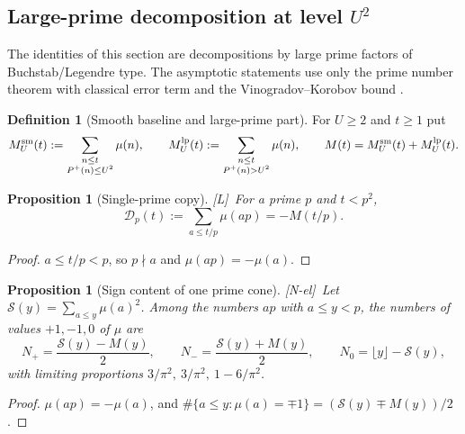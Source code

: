 \documentclass[11pt]{amsart}
\numberwithin{equation}{section}
\theoremstyle{plain}
\newtheorem{proposition}[theorem]{Proposition}
\theoremstyle{definition}
\newtheorem{definition}[theorem]{Definition}
\theoremstyle{remark}
\newcommand{\Pp}{P^{+}}
\newcommand{\Sq}{\mathcal{S}}
\newcommand{\tagNE}{\textup{[N-el]}}
\newcommand{\tagL}{\textup{[L]}}
\begin{document}
\subsection{Large-prime decomposition at level \texorpdfstring{$U^2$}{U squared}}
\label{sec:prime_copy_propagation}

The identities of this section are decompositions by large prime factors of
Buchstab/Legendre type. The asymptotic statements use only the prime number
theorem with classical error term and the Vinogradov--Korobov bound
\cite{MontgomeryVaughan2007,Walfisz1963}.

\begin{definition}[Smooth baseline and large-prime part]
\label{def:baseline_channel}
For $U\ge2$ and $t\ge1$ put
\begin{equation}
\label{eq:baseline_channel_def}
  M^{\rm sm}_U(t):=\sum_{\substack{n\le t\\ \Pp(n)\le U^2}}\mu(n),\qquad
  M^{\rm lp}_U(t):=\sum_{\substack{n\le t\\ \Pp(n)>U^2}}\mu(n),\qquad
  M(t)=M^{\rm sm}_U(t)+M^{\rm lp}_U(t).
\end{equation}
\end{definition}

\begin{proposition}[Single-prime copy]
\label{prop:single_prime_copy}
\tagL\ For a prime $p$ and $t<p^2$,
\begin{equation}
\label{eq:single-prime-copy}
  \mathcal D_p(t):=\sum_{a\le t/p}\mu(ap)=-M(t/p).
\end{equation}
\end{proposition}

\begin{proof}
$a\le t/p<p$, so $p\nmid a$ and $\mu(ap)=-\mu(a)$.
\end{proof}

\begin{proposition}[Sign content of one prime cone]
\label{prop:prime-cone-signs}
\tagNE\ Let $\Sq(y)=\sum_{a\le y}\mu(a)^2$. Among the numbers $ap$ with $a\le y<p$,
the numbers of values $+1,-1,0$ of $\mu$ are
\begin{equation}
\label{eq:cone_counts}
  N_+=\frac{\Sq(y)-M(y)}{2},\qquad N_-=\frac{\Sq(y)+M(y)}{2},\qquad
  N_0=\lfloor y\rfloor-\Sq(y),
\end{equation}
with limiting proportions $3/\pi^2,\ 3/\pi^2,\ 1-6/\pi^2$.
\end{proposition}

\begin{proof}
$\mu(ap)=-\mu(a)$, and $\#\{a\le y:\mu(a)=\mp1\}=(\Sq(y)\mp M(y))/2$.
\end{proof}
\end{document}
